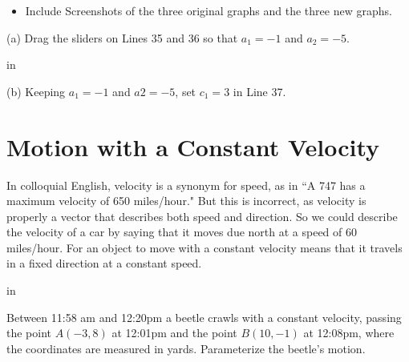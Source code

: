 \documentclass{ximera}
\newcommand{\pskip}{\vskip 0.1 in}
\begin{document}
\begin{example}
\begin{exploration}
\begin{itemize}
\item{Include Screenshots of the three original graphs and the three new graphs.}

\end{itemize}

(a) Drag the sliders on Lines 35 and 36 so that $a_1=-1$ and $a_2=-5$. 

\pskip

(b) Keeping  $a_1 = -1$ and $a2=-5$, set $c_1=3$ in Line 37.  



 
\begin{onlineOnly}
    \begin{center}
\end{center}
\end{onlineOnly}
\end{exploration}


\end{example}




\section{Motion with a Constant Velocity}

In colloquial English, velocity is a synonym for speed, as in ``A 747 has a maximum velocity of 650 miles/hour." But this is incorrect, as velocity is properly a vector that describes both speed and direction. So we could describe the velocity of a car by saying that it moves due north at a speed of 60 miles/hour. For an object to move with a constant velocity means that it travels in a fixed direction at a constant speed.

\pskip

\begin{example}   \label{Ex1}
 Between 11:58 am and 12:20pm a beetle crawls with a constant velocity, passing the point $A(-3,8)$ at 12:01pm and the point $B(10,-1)$ at 12:08pm, where the coordinates are measured in yards. Parameterize the beetle's motion.
\end{example}
\end{document}
